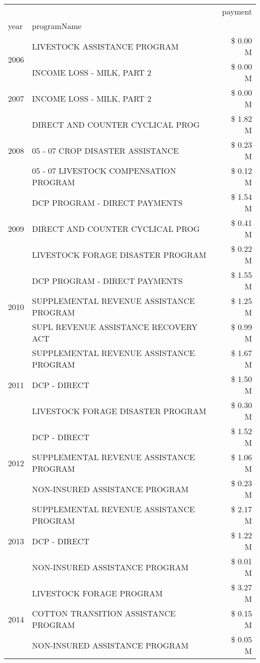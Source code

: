 \begin{tabular}{llr}
\toprule
 &  & payment \\
year & programName &  \\
\midrule
\multirow[t]{2}{*}{2006} & LIVESTOCK ASSISTANCE PROGRAM & \$ 0.00 M \\
 & INCOME LOSS - MILK, PART 2 & \$ 0.00 M \\
\cline{1-3}
2007 & INCOME LOSS - MILK, PART 2 & \$ 0.00 M \\
\cline{1-3}
\multirow[t]{3}{*}{2008} & DIRECT AND COUNTER CYCLICAL PROG & \$ 1.82 M \\
 & 05 - 07 CROP DISASTER ASSISTANCE & \$ 0.23 M \\
 & 05 - 07 LIVESTOCK COMPENSATION PROGRAM & \$ 0.12 M \\
\cline{1-3}
\multirow[t]{3}{*}{2009} & DCP PROGRAM - DIRECT PAYMENTS & \$ 1.54 M \\
 & DIRECT AND COUNTER CYCLICAL PROG & \$ 0.41 M \\
 & LIVESTOCK FORAGE DISASTER  PROGRAM & \$ 0.22 M \\
\cline{1-3}
\multirow[t]{3}{*}{2010} & DCP PROGRAM - DIRECT PAYMENTS & \$ 1.55 M \\
 & SUPPLEMENTAL REVENUE ASSISTANCE PROGRAM & \$ 1.25 M \\
 & SUPL REVENUE ASSISTANCE RECOVERY ACT & \$ 0.99 M \\
\cline{1-3}
\multirow[t]{3}{*}{2011} & SUPPLEMENTAL REVENUE ASSISTANCE PROGRAM & \$ 1.67 M \\
 & DCP - DIRECT & \$ 1.50 M \\
 & LIVESTOCK FORAGE DISASTER PROGRAM & \$ 0.30 M \\
\cline{1-3}
\multirow[t]{3}{*}{2012} & DCP - DIRECT & \$ 1.52 M \\
 & SUPPLEMENTAL REVENUE ASSISTANCE PROGRAM & \$ 1.06 M \\
 & NON-INSURED ASSISTANCE PROGRAM & \$ 0.23 M \\
\cline{1-3}
\multirow[t]{3}{*}{2013} & SUPPLEMENTAL REVENUE ASSISTANCE PROGRAM & \$ 2.17 M \\
 & DCP - DIRECT & \$ 1.22 M \\
 & NON-INSURED ASSISTANCE PROGRAM & \$ 0.01 M \\
\cline{1-3}
\multirow[t]{3}{*}{2014} & LIVESTOCK FORAGE PROGRAM & \$ 3.27 M \\
 & COTTON TRANSITION ASSISTANCE PROGRAM & \$ 0.15 M \\
 & NON-INSURED ASSISTANCE PROGRAM & \$ 0.05 M \\

\end{tabular}
